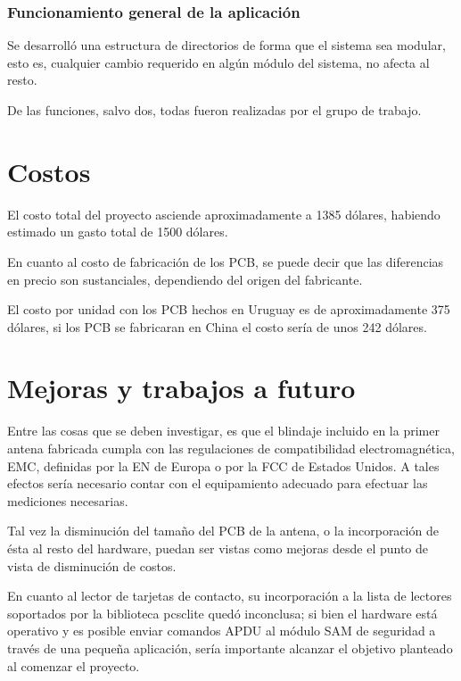\documentclass[%
        final,
        notitlepage,
        narroweqnarray,
        inline,
        ]{ieee}
\begin{document}
\bigskip
\subsubsection*{Funcionamiento general de la aplicación}

Se desarrolló una estructura de directorios de forma que el sistema sea modular, esto es, cualquier cambio requerido en algún módulo del sistema, no afecta al resto.

De las funciones, salvo dos, todas fueron realizadas por el grupo de trabajo. \pagebreak 


\section{Costos}

El costo total del proyecto asciende aproximadamente a 1385 dólares, habiendo 
estimado un gasto total de 1500 dólares.

En cuanto al costo de fabricación de los PCB, se puede decir
que las diferencias en precio son sustanciales, dependiendo
del origen del fabricante. 

El costo por unidad con los PCB hechos en Uruguay es de aproximadamente 375 dólares, si los PCB se fabricaran en China el costo sería de unos 242 dólares.


\section{Mejoras y trabajos a futuro}

Entre las cosas que se deben investigar, es que el blindaje incluido 
en la primer antena fabricada cumpla con las regulaciones de compatibilidad 
electromagnética, EMC, definidas por la EN de Europa o por la FCC de Estados 
Unidos. A tales efectos sería necesario contar con el equipamiento adecuado
para efectuar las mediciones necesarias.

Tal vez la disminución del tamaño del PCB de la antena, o la incorporación
de ésta al resto del hardware, puedan ser vistas como mejoras desde el 
punto de vista de disminución de costos.

En cuanto al lector de tarjetas de contacto, su incorporación a la lista
de lectores soportados por la biblioteca pcsclite quedó inconclusa; si 
bien el hardware está operativo y es posible enviar comandos APDU al 
módulo SAM de seguridad a través de una pequeña aplicación, sería 
importante alcanzar el objetivo planteado al comenzar el proyecto.
\end{document}

